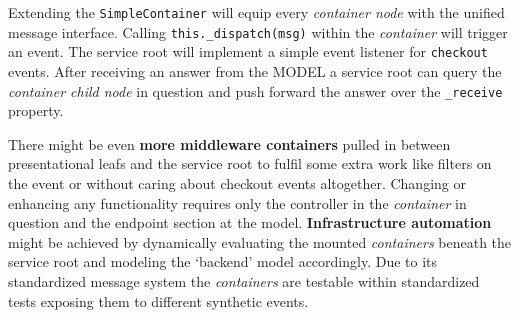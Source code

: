 \documentclass[]{article}
\newenvironment{Shaded}{}{}
\newcommand{\KeywordTok}[1]{\textcolor[rgb]{0.00,0.44,0.13}{\textbf{{#1}}}}
\newcommand{\DataTypeTok}[1]{\textcolor[rgb]{0.56,0.13,0.00}{{#1}}}
\newcommand{\SpecialCharTok}[1]{\textcolor[rgb]{0.25,0.44,0.63}{{#1}}}
\newcommand{\StringTok}[1]{\textcolor[rgb]{0.25,0.44,0.63}{{#1}}}
\newcommand{\VerbatimStringTok}[1]{\textcolor[rgb]{0.25,0.44,0.63}{{#1}}}
\newcommand{\CommentTok}[1]{\textcolor[rgb]{0.38,0.63,0.69}{\textit{{#1}}}}
\newcommand{\VariableTok}[1]{\textcolor[rgb]{0.10,0.09,0.49}{{#1}}}
\newcommand{\OperatorTok}[1]{\textcolor[rgb]{0.40,0.40,0.40}{{#1}}}
\newcommand{\AttributeTok}[1]{\textcolor[rgb]{0.49,0.56,0.16}{{#1}}}
\newcommand{\NormalTok}[1]{{#1}}
\begin{document}
\begin{Shaded}
\end{Shaded}

Extending the \texttt{SimpleContainer} will equip every \emph{container
node} with the unified message interface. Calling
\texttt{this.\_dispatch(msg)} within the \emph{container} will trigger
an event. The service root will implement a simple event listener for
\texttt{checkout} events. After receiving an answer from the MODEL a
service root can query the \emph{container child node} in question and
push forward the answer over the \texttt{\_receive} property.

There might be even \textbf{more middleware containers} pulled in
between presentational leafs and the service root to fulfil some extra
work like filters on the event or without caring about checkout events
altogether. Changing or enhancing any functionality requires only the
controller in the \emph{container} in question and the endpoint section
at the model. \textbf{Infrastructure automation} might be achieved by
dynamically evaluating the mounted \emph{containers} beneath the service
root and modeling the `backend' model accordingly. Due to its
standardized message system the \emph{containers} are testable within
standardized tests exposing them to different synthetic events.
\end{document}
